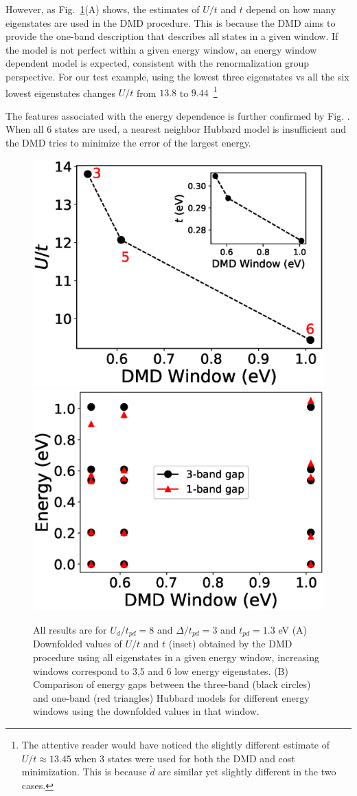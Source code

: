 However, as Fig.~\ref{fig:windows}(A) shows, the estimates of $U/t$ and $t$ depend on how many eigenstates 
are used in the DMD procedure. This is because the DMD aims to provide the one-band description 
that describes all states in a given window. If the model is not perfect within a given energy window, 
an energy window dependent model is expected, consistent with the renormalization group perspective. For our test example, 
using the lowest three eigenstates vs all the six lowest eigenstates changes $U/t$ from $13.8$ to $9.44$~\footnote{The attentive reader would have noticed the slightly different estimate of $U/t\approx 13.45$ when 3 states were used for both the DMD and cost minimization. This is because $\tilde{d}$ are similar yet slightly different in the two cases.} 

The features associated with the energy dependence  is further confirmed by Fig. . When all 6 states are used, 
a nearest neighbor Hubbard model is insufficient and the DMD tries to minimize the error of the largest energy. 
\begin{figure}
\centering
\includegraphics[width=0.49\linewidth]{./Figures/downfolded_params_diffwindows_ep_3.eps}
\includegraphics[width=0.49\linewidth]{./Figures/lowenergygaps_diffwindows_ep_3.eps}
\caption{All results are for $U_d/t_{pd}=8$ and $\Delta/t_{pd}=3$ and $t_{pd}=1.3$ eV 
(A) Downfolded values of $U/t$ and $t$ (inset) obtained by the DMD procedure using all eigenstates 
in a given energy window, increasing windows correspond to 3,5 and 6 low energy eigenstates. 
(B) Comparison of energy gaps between the three-band (black circles) and one-band (red triangles) 
Hubbard models for different energy windows using the downfolded values in that window.}
\label{fig:windows} 
\end{figure}	


